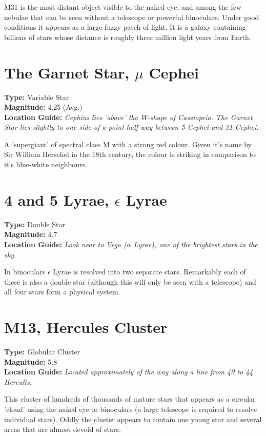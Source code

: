 M31 is the most distant object visible to the naked eye, and among the few nebulae that can be seen without a telescope or powerful binoculars. Under good conditions it appears as a large fuzzy patch of light. It is a galaxy containing billions of stars whose distance is roughly three million light years from Earth. 

\section{The Garnet Star, $\mu$ Cephei}
\textbf{Type:} Variable Star \\
\textbf{Magnitude:} 4.25 (Avg.) \\
\textbf{Location Guide:} \textit{Cephius lies 'above' the W-shape of Cassiopeia. The Garnet Star lies slightly to one side of a point half way between 5 Cephei and 21 Cephei.}

A 'supergiant' of spectral class M with a strong red colour. Given it's name by Sir William Herschel in the 18th century, the colour is striking in comparison to it's blue-white neighbours. 

\section{4 and 5 Lyrae, $\epsilon$ Lyrae}
\textbf{Type:} Double Star \\
\textbf{Magnitude:} 4.7 \\
\textbf{Location Guide:} \textit{Look near to Vega ($\alpha$ Lyrae), one of the brightest stars in the sky.}

In binoculars $\epsilon$ Lyrae is resolved into two separate stars. Remarkably each of these is also a double star (although this will only be seen with a telescope) and all four stars form a physical system. 

\section{M13, Hercules Cluster} 
\textbf{Type:} Globular Cluster \\ 
\textbf{Magnitude:} 5.8 \\
\textbf{Location Guide:} \textit{Located approximately of the way along a line from 40 to 44 Herculis.}

This cluster of hundreds of thousands of mature stars that appears as a circular 'cloud' using the naked eye or binoculars (a large telescope is required to resolve individual stars). Oddly the cluster appears to contain one young star and several areas that are almost devoid of stars. 

